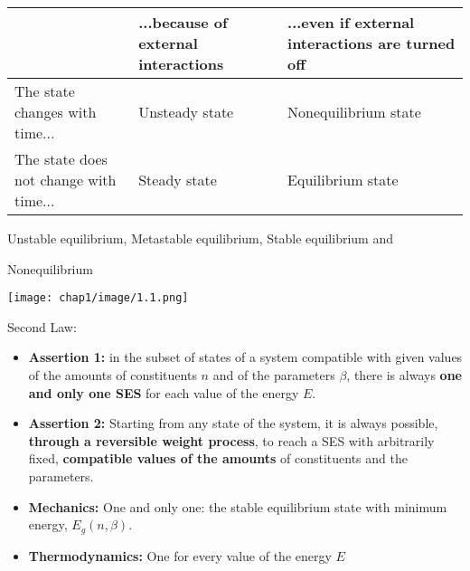 \begin{minipage}{0.85\textwidth}
    \centering
    \begin{tabular}{|p{4cm}<{\centering}|p{4cm}<{\centering}|p{5cm}<{\centering}|}
        \hline
            ~ & ...because of external interactions & ...even if external interactions are turned off \\ 
        \hline
            The state changes with time... & Unsteady state  & Nonequilibrium state \\
        \hline
            The state does not change with time... & Steady state  & Equilibrium state \\ 
        \hline
    \end{tabular}
\end{minipage}
\begin{defn}
    Unstable equilibrium,
    Metastable equilibrium,
Stable equilibrium and

Nonequilibrium
    \par\indent
\begin{minipage}{0.8\textwidth}
    \centering
    \texttt{[image: chap1/image/1.1.png]}
\end{minipage}
\end{defn}
\begin{law}
    Second Law:

\begin{itemize}
\item \textbf{Assertion 1:} in the subset of states of a system compatible with 
given values of the amounts of constituents \( n \) and of the parameters \( \beta \), 
there is always \textbf{one and only one SES} for each value of the energy \( E \).  
\item \textbf{Assertion 2:} Starting from any state of the system, it is always possible, 
\textbf{through a reversible weight process}, to reach a SES with arbitrarily fixed, 
\textbf{compatible values of the amounts} of constituents and the parameters.
\end{itemize}
\begin{zhu}
    \par\indent
    \begin{itemize}
    \item \textbf{Mechanics:} One and only one: the stable equilibrium state with minimum energy, \( E_g (n, \beta) \). 
    \item \textbf{Thermodynamics:} One for every value of the energy \( E \)
\end{itemize}
\end{zhu}
\end{law}
